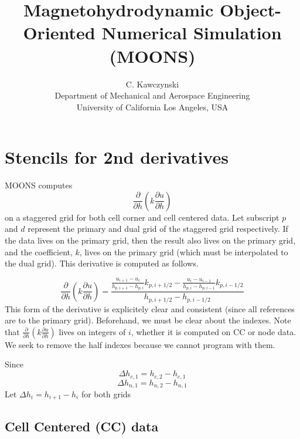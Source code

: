 \documentclass[11pt]{article}
\begin{document}
\doublespacing
\title{Magnetohydrodynamic Object-Oriented Numerical Simulation (MOONS)}
\author{C. Kawczynski \\
Department of Mechanical and Aerospace Engineering \\
University of California Los Angeles, USA\\
}
\maketitle


\section{Stencils for 2nd derivatives}
MOONS computes
\begin{equation}
\frac{\partial}{\partial h} \left( k \frac{\partial u}{\partial h} \right)
\end{equation}
on a staggered grid for both cell corner and cell centered data. Let subscript $p$ and $d$ represent the primary and dual grid of the staggered grid respectively. If the data lives on the primary grid, then the result also lives on the primary grid, and the coefficient, $k$, lives on the primary grid (which must be interpolated to the dual grid). This derivative is computed as follows.

\begin{equation}
\frac{\partial}{\partial h} \left( k \frac{\partial u}{\partial h} \right)
 = \frac{\frac{u_{i+1}-u_{i}}{h_{p,i+1}-h_{p,i}} k_{p,i+1/2} - \frac{u_{i}-u_{i-1}}{h_{p,i}-h_{p,i-1}} k_{p,i-1/2}}{h_{p,i+1/2} - h_{p,i-1/2}}
\end{equation}
This form of the derivative is explicitely clear and consistent (since all references are to the primary grid). Beforehand, we must be clear about the indexes. Note that $\frac{\partial}{\partial h} \left( k \frac{\partial u}{\partial h} \right)$ lives on integers of $i$, whether it is computed on CC or node data. We seek to remove the half indexes because we cannot program with them.

Since
\begin{equation}
  \Delta h_{c,1} = h_{c,2} - h_{c,1}
\end{equation}
\begin{equation}
  \Delta h_{n,1} = h_{n,2} - h_{n,1}
\end{equation}
Let $\Delta h_i = h_{i+1} - h_i$ for both grids

\subsection{Cell Centered (CC) data}
\end{document}

